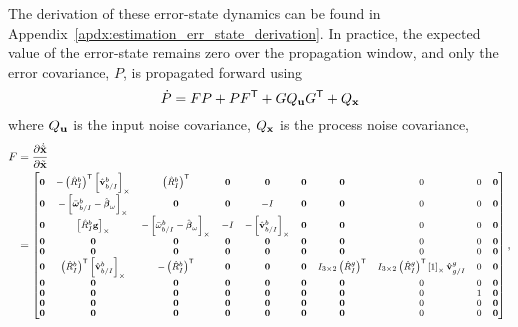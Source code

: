 The derivation of these error-state dynamics can be found in
Appendix~\ref{apdx:estimation_err_state_derivation}. In practice, the expected
value of the error-state remains zero over the propagation window, and only the
error covariance, $P$, is propagated forward using
\begin{equation}
  \dot{P} = FP + PF^{\mathsf{T}} + G Q_{\boldsymbol{\mathrm{u}}} G^{\mathsf{T}} + Q_{\boldsymbol{\mathrm{x}}}
\end{equation}
where $Q_{\boldsymbol{\mathrm{u}}}$ is the input noise covariance, $Q_{\boldsymbol{\mathrm{x}}}$ is the
process noise covariance, 
\begin{align}
  F &= \frac{ \partial \dot{\tilde{\x}} }{ \partial \tilde{\x} } \\
    &=
    \scriptsize
    \begin{bmatrix}
      \vect{0} & - \left( \hat{R}_I^b \right)^\transpose
      \skewmat{\hat{\vect{v}}_{b/I}^b} & \left( \hat{R}_I^b \right)^\transpose &
      \vect{0} & \vect{0} & \vect{0} & \vect{0}
               & 0 & 0 & \vect{0} \\
      \vect{0} & -\skewmat{ \bar{\vect{\omega}}_{b/I}^b
      - \hat{\vect{\beta}}_\omega} & \vect{0} & \vect{0} & -I & \vect{0} & \vect{0}
               & 0 & 0 & \vect{0} \\
      \vect{0} & \skewmat{ \hat{R}_I^b \vect{g} } &
      -\skewmat{ \bar{\omega}_{b/I}^b - \hat{\vect{\beta}}_\omega } & -I &
      -\skewmat{ \hat{\vect{v}}_{b/I}^b } & \vect{0} & \vect{0}
               & 0 & 0 & \vect{0} \\
      \vect{0} & \vect{0} & \vect{0} & \vect{0} & \vect{0} & \vect{0} & \vect{0}
               & 0 & 0 & \vect{0} \\
      \vect{0} & \vect{0} & \vect{0} & \vect{0} & \vect{0} & \vect{0} & \vect{0}
               & 0 & 0 & \vect{0} \\
      \vect{0} & \left( \hat{R}_{I}^{b} \right)^\transpose
      \skewmat{ \hat{\vect{v}}_{b/I}^{b} } & 
      -\left( \hat{R}_{I}^{b} \right)^\transpose & \vect{0} & \vect{0} & \vect{0} & 
      I_{3 \times 2} \left( \hat{R}_{I}^{g} \right)^\transpose
               & I_{3 \times 2} \left( \hat{R}_{I}^{g} \right)^\transpose
               \skewmat{ 1 } \hat{\vect{v}}_{g/I}^g
               & 0 & \vect{0} \\
      \vect{0} & \vect{0} & \vect{0} & \vect{0} & \vect{0} & \vect{0} & \vect{0}
               & 0 & 0 & \vect{0} \\
      \vect{0} & \vect{0} & \vect{0} & \vect{0} & \vect{0} & \vect{0} & \vect{0}
               & 0 & 1 & \vect{0} \\
      \vect{0} & \vect{0} & \vect{0} & \vect{0} & \vect{0} & \vect{0} & \vect{0}
               & 0 & 0 & \vect{0} \\
      \vect{0} & \vect{0} & \vect{0} & \vect{0} & \vect{0} & \vect{0} & \vect{0}
               & 0 & 0 & \vect{0}
    \end{bmatrix},
\end{align}

